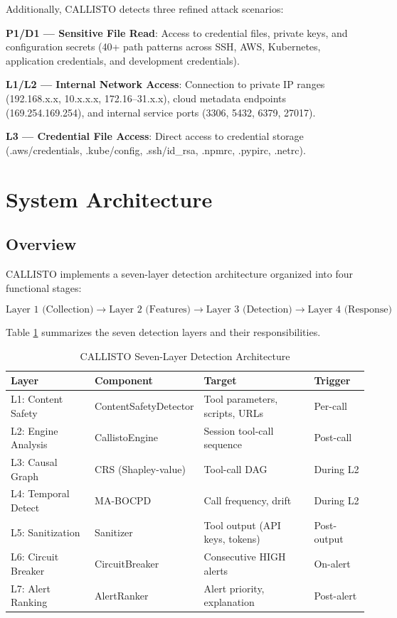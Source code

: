 \documentclass[10pt,conference]{IEEEtran}
\begin{document}
Additionally, CALLISTO detects three refined attack scenarios:

\textbf{P1/D1 — Sensitive File Read}: Access to credential files, private keys, and configuration secrets (40+ path patterns across SSH, AWS, Kubernetes, application credentials, and development credentials).

\textbf{L1/L2 — Internal Network Access}: Connection to private IP ranges (192.168.x.x, 10.x.x.x, 172.16–31.x.x), cloud metadata endpoints (169.254.169.254), and internal service ports (3306, 5432, 6379, 27017).

\textbf{L3 — Credential File Access}: Direct access to credential storage (.aws/credentials, .kube/config, .ssh/id\_rsa, .npmrc, .pypirc, .netrc).

\section{System Architecture}

\subsection{Overview}

CALLISTO implements a seven-layer detection architecture organized into four functional stages:

\begin{equation}
\text{Layer 1 (Collection)} \rightarrow \text{Layer 2 (Features)} \rightarrow \text{Layer 3 (Detection)} \rightarrow \text{Layer 4 (Response)}
\end{equation}

Table \ref{tab:layers} summarizes the seven detection layers and their responsibilities.

\begin{table}[!t]
\renewcommand{\arraystretch}{1.2}
\caption{CALLISTO Seven-Layer Detection Architecture}
\label{tab:layers}
\centering
\begin{tabular}{@{}p{2.2cm}p{2.8cm}p{2.2cm}p{1.3cm}@{}}
\toprule
\textbf{Layer} & \textbf{Component} & \textbf{Target} & \textbf{Trigger} \\
\midrule
L1: Content Safety & ContentSafetyDetector & Tool parameters, scripts, URLs & Per-call \\
L2: Engine Analysis & CallistoEngine & Session tool-call sequence & Post-call \\
L3: Causal Graph & CRS (Shapley-value) & Tool-call DAG & During L2 \\
L4: Temporal Detect & MA-BOCPD & Call frequency, drift & During L2 \\
L5: Sanitization & Sanitizer & Tool output (API keys, tokens) & Post-output \\
L6: Circuit Breaker & CircuitBreaker & Consecutive HIGH alerts & On-alert \\
L7: Alert Ranking & AlertRanker & Alert priority, explanation & Post-alert \\
\bottomrule
\end{tabular}
\end{table}
\end{document}
